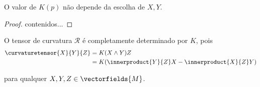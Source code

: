 \begin{prop}
	O valor de $K(p)$ não depende da escolha de $X,Y$.
\end{prop}

\begin{proof}
	contenidos...
\end{proof}


\begin{obse}
	O tensor de curvatura $\mathcal{R}$ é completamente determinado por $K$, pois
	\begin{align*}
		\curvaturetensor{X}{Y}{Z} &= K(X \wedge Y) Z\\
		&= K(\innerproduct{Y}{Z} X - \innerproduct{X}{Z} Y)
	\end{align*}
	
	para qualquer $X,Y,Z \in \vectorfields{M}$.
\end{obse}

